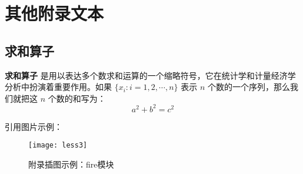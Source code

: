 
\chapter{其他附录文本}

\lipsum[2]

\section{求和算子}

\textbf{求和算子} 是用以表达多个数求和运算的一个缩略符号，它在统计学和计量经济学分析中扮演着重要作用。如果 $\{x_i: i=1, 2, \cdots, n\}$ 表示 $n$ 个数的一个序列，那么我们就把这 $n$ 个数的和写为：
\begin{equation}
\label{eq:2}
a^2+b^2=c^2
\end{equation}

引用图片示例：

\begin{figure}[!htbp]
	\centering
	\texttt{[image: less3]}
	\caption{附录插图示例：f\/ire模块}
     \label{appen:fire}
\end{figure}
